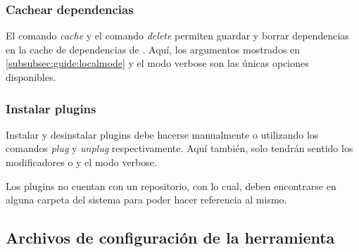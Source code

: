 \subsubsection{Cachear dependencias}
\label{subsubsec:commands:cache}

El comando \emph{cache} y el comando \emph{delete} permiten guardar y borrar
dependencias en la cache de dependencias de \fronttier. Aquí, los
argumentos mostrados en \ref{subsubsec:guide:localmode} y el modo verbose son
las únicas opciones disponibles.

\subsubsection{Instalar plugins}
\label{subsubsec:commands:plugins}

Instalar y desinstalar plugins debe hacerse manualmente o utilizando los comandos
\emph{plug} y \emph{unplug} respectivamente. Aquí también, solo tendrán sentido los
modificadores  o  y el modo verbose.

Los plugins no cuentan con un repositorio, con lo cual, deben encontrarse en alguna
carpeta del sistema para poder hacer referencia al mismo.

\subsection{Archivos de configuración de la herramienta}
\label{subsec:guide:conffiles}

